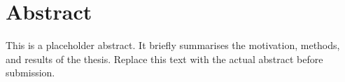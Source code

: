 \chapter*{Abstract}

This is a placeholder abstract.
It briefly summarises the motivation, methods, and results of the thesis.
Replace this text with the actual abstract before submission.

\cleardoublepage
